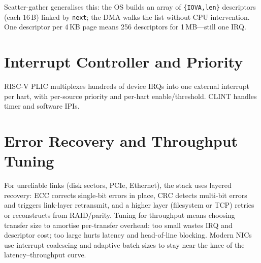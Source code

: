Scatter-gather generalises this: the OS builds an array of
\texttt{\{IOVA,len\}} descriptors (each 16\,B) linked by \texttt{next};
the DMA walks the list without CPU intervention. One descriptor per 4\,KB page
means 256 descriptors for 1\,MB---still one IRQ.

\section{Interrupt Controller and Priority}
RISC-V PLIC multiplexes hundreds of device IRQs into one external interrupt
per hart, with per-source priority and per-hart enable/threshold. CLINT
handles timer and software IPIs.

\begin{center}
\end{center}

\section{Error Recovery and Throughput Tuning}
For unreliable links (disk sectors, PCIe, Ethernet), the stack uses layered
recovery: ECC corrects single-bit errors in place, CRC detects multi-bit
errors and triggers link-layer retransmit, and a higher layer (filesystem or
TCP) retries or reconstructs from RAID/parity. Tuning for throughput means
choosing transfer size to amortise per-transfer overhead: too small wastes IRQ
and descriptor cost; too large hurts latency and head-of-line blocking.
Modern NICs use interrupt coalescing and adaptive batch sizes to stay near
the knee of the latency--throughput curve.

